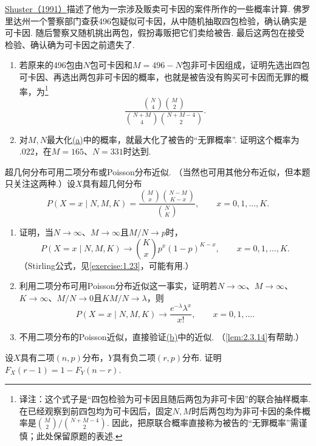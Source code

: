 \begin{exercise}\label{exercise:3.10}
\hyperref[bib:source290]{Shuster（1991）}描述了他为一宗涉及贩卖可卡因的案件所作的一些概率计算. 佛罗里达州一个警察部门查获496包疑似可卡因，从中随机抽取四包检验，确认确实是可卡因. 随后警察又随机挑出两包，假扮毒贩把它们卖给被告. 最后这两包在接受检验、确认确为可卡因之前遗失了.
\begin{enumerate}
\item[(a)]\label{itm:exercise:3.10:a} 若原来的496包由$N$包可卡因和$M=496-N$包非可卡因组成，证明先选出四包可卡因、再选出两包非可卡因的概率，也就是被告没有购买可卡因而无罪的概率，为\footnote{译注：这个式子是“四包检验为可卡因且随后两包为非可卡因”的联合抽样概率. 在已经观察到前四包均为可卡因后，固定$N,M$时后两包均为非可卡因的条件概率是$\binom M2/\binom{N+M-4}2$. 因此，把原联合概率直接称为被告的“无罪概率”需谨慎；此处保留原题的表述.}
$$\frac{\binom N4\binom M2}{\binom{N+M}4\binom{N+M-4}2}.$$

\item[(b)] 对$M,N$最大化\hyperref[itm:exercise:3.10:a]{(a)}中的概率，就最大化了被告的“无罪概率”. 证明这个概率为$.022$，在$M=165$、$N=331$时达到.
\end{enumerate}
\end{exercise}
\begin{exercise}\label{exercise:3.11}
超几何分布可用二项分布或Poisson分布近似. （当然也可用其他分布近似，但本题只关注这两种.）设$X$具有超几何分布
$$P(X=x\mid N,M,K)=\frac{\binom Mx\binom{N-M}{K-x}}{\binom NK},\qquad x=0,1,\ldots,K.$$
\begin{enumerate}
\item[(a)] 证明，当$N\to\infty$、$M\to\infty$且$M/N\to p$时，
$$P(X=x\mid N,M,K)\to\binom Kx p^x(1-p)^{K-x},\qquad x=0,1,\ldots,K.$$
（Stirling公式，见\autoref{exercise:1.23}，可能有用.）
\item[(b)]\label{itm:exercise:3.11:b} 利用二项分布可用Poisson分布近似这一事实，证明若$N\to\infty$、$M\to\infty$、$K\to\infty$、$M/N\to0$且$KM/N\to\lambda$，则
$$P(X=x\mid N,M,K)\to\frac{e^{-\lambda}\lambda^x}{x!},\qquad x=0,1,\ldots.$$
\item[(c)] 不用二项分布的Poisson近似，直接验证\hyperref[itm:exercise:3.11:b]{(b)}中的近似. （\autoref{lem:2.3.14}有帮助.）
\end{enumerate}
\end{exercise}
\begin{exercise}\label{exercise:3.12}
设$X$具有二项$(n,p)$分布，$Y$具有负二项$(r,p)$分布. 证明$F_X(r-1)=1-F_Y(n-r)$.
\end{exercise}

